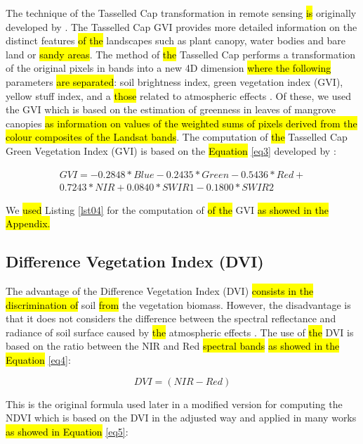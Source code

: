 \documentclass[jmse,article,submit,pdftex,moreauthors]{Definitions/mdpi}
\begin{document}
The technique of the Tasselled Cap transformation in remote sensing \hl{is} originally developed by \cite{KauthThomas}. The Tasselled Cap GVI provides more detailed information on the distinct features \hl{of the }landscapes such as plant canopy, water bodies and bare land or \hl{sandy areas}. The method of \hl{the }Tasselled Cap performs a transformation of the original pixels in bands into a new 4D dimension \hl{where the following } parameters \hl{are separated}: soil brightness index, green vegetation index (GVI), yellow stuff index, and a \hl{those} related to atmospheric effects \cite{Huang2002}. Of these, we used the GVI which is based on the estimation of greenness in leaves of mangrove canopies \hl{as information on values of the weighted sums of pixels derived from the colour composites of the Landsat bands}. The computation of \hl{the }Tasselled Cap Green Vegetation Index (GVI) is based on the \hl{Equation }\ref{eq3} developed by \cite{4157507}:

\begin{equation}\label{eq3}
\begin{split}
	GVI = -0.2848 * Blue - 0.2435 * Green - 0.5436 * Red + \\
	0.7243 * NIR + 0.0840 * SWIR1- 0.1800 * SWIR2
\end{split}
\end{equation}

We \hl{used} Listing \ref{lst04} for the computation of \hl{of the }GVI\hl{ as showed in the Appendix.}

\subsection{Difference Vegetation Index (DVI)}

The advantage of the Difference Vegetation Index (DVI) \hl{consists in the discrimination of} soil \hl{from} the vegetation biomass. However, the disadvantage is that it does not considers the difference between the spectral reflectance and radiance of soil surface caused by \hl{the }atmospheric effects \cite{TUCKER1979127}. The use of \hl{the }DVI is based on the ratio between the NIR and Red \hl{spectral bands} \cite{Naji2018} \hl{as showed in the Equation} \ref{eq4}:

\begin{equation}\label{eq4}
	DVI = (NIR - Red)
\end{equation}

This is the original formula used later in a modified version for computing the NDVI which is based on the DVI in the adjusted way and applied in many works \cite{TUCKER1979237,RONDEAUX199695,DATT1998111} \hl{as showed in Equation} \ref{eq5}:
\end{document}
